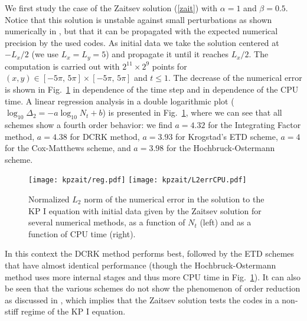\documentclass[final]{siamltex}
\begin{document}
We first study the case of the Zaitsev solution (\ref{zait}) with 
$\alpha=1$ and $\beta=0.5$. Notice that this 
solution is unstable against small perturbations
as shown numerically in \cite{KS10}, but that it 
can be propagated with the expected numerical precision by the used 
codes. As initial data we 
take the solution centered at $-L_{x}/2$ (we use $L_{x}=L_{y}=5$) 
and propagate it until it 
reaches $L_{x}/2$. 
The computation is carried out with $2^{11}\times2^{9}$ points for
$(x, y)\in[-5\pi,\,5\pi]\times[-5\pi,\,5\pi]$ and $t\leq1$.
The decrease of the numerical error is shown in 
Fig.~\ref{figzaitreg} in dependence of the time step and 
in dependence of the CPU time.
A linear regression analysis in a double logarithmic plot 
($\log_{10}\Delta_{2}=-a\log_{10}N_{t}+b$)
is presented in Fig.~\ref{figzaitreg}, where we can see that all schemes 
show a fourth order behavior:   we find $a=4.32$ for the Integrating Factor method, $a=4.38$ for
DCRK method, $a=3.93$ for Krogstad's ETD scheme, $a=4$ for 
the Cox-Matthews scheme, and $a=3.98$ for the Hochbruck-Ostermann scheme.
\begin{figure}[htb!]
 \centering
 \texttt{[image: kpzait/reg.pdf]}
 \texttt{[image: kpzait/L2errCPU.pdf]}
 \caption{Normalized $L_{2}$ norm of the numerical error 
 in the solution to the KP I equation with initial data given by the 
 Zaitsev solution for several numerical
 methods, as a function of $N_{t}$ (left) and as a function of CPU 
 time (right).}
 \label{figzaitreg}
\end{figure}
In this context the DCRK method performs best, 
followed by the ETD schemes that have almost 
identical performance (though the Hochbruck-Ostermann method uses 
more internal stages and thus more CPU time in 
Fig.~\ref{figzaitreg}). It can also be seen 
that the various schemes do not show the phenomenon of order 
reduction as discussed in \cite{HO}, which implies that the Zaitsev 
solution tests the codes in a non-stiff regime of the KP I equation. 
\end{document}
